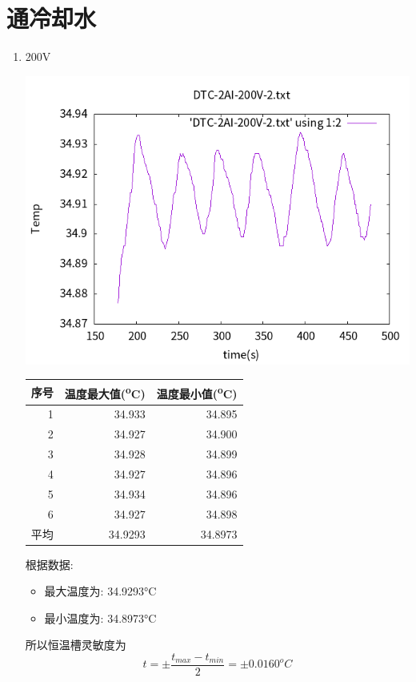 \documentclass[11pt]{report}
\begin{document}
\section{通冷却水}
\label{sec:orga1ed473}
\begin{enumerate}
\item 200V
\label{sec:org61c5db0}
\begin{center}
\includegraphics[width=.9\linewidth]{../img/DTC-2AI-200V-2.txt.png}
\end{center}
\begin{center}
\begin{tabular}{rrr}
序号 & 温度最大值(\textsuperscript{o}C) & 温度最小值(\textsuperscript{o}C)\\
\hline
1 & 34.933 & 34.895\\
2 & 34.927 & 34.900\\
3 & 34.928 & 34.899\\
4 & 34.927 & 34.896\\
5 & 34.934 & 34.896\\
6 & 34.927 & 34.898\\
平均 & 34.9293 & 34.8973\\
\end{tabular}
\end{center}

根据数据:
\begin{itemize}
\item 最大温度为: 34.9293°C
\item 最小温度为: 34.8973°C
\end{itemize}
所以恒温槽灵敏度为
\[
t=\pm\frac{t_{max}-t_{min}}{2}=\pm 0.0160^{o}C
\]




\end{enumerate}
\end{document}
